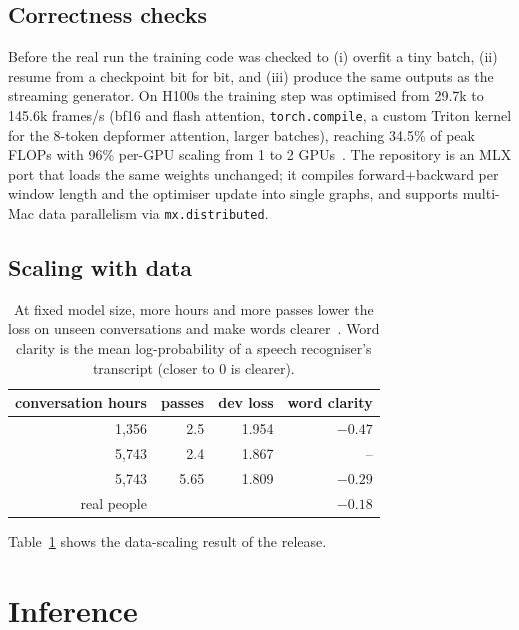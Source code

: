\documentclass[10pt]{article}
\begin{document}
\subsection{Correctness checks}
Before the real run the training code was checked to (i) overfit a tiny batch, (ii) resume from a checkpoint bit for bit, and (iii) produce the same outputs as the streaming generator. On H100s the training step was optimised from 29.7k to 145.6k frames/s (bf16 and flash attention, \texttt{torch.compile}, a custom Triton kernel for the 8-token depformer attention, larger batches), reaching 34.5\% of peak FLOPs with 96\% per-GPU scaling from 1 to 2 GPUs~\cite{caramel1}. The repository is an MLX port that loads the same weights unchanged; it compiles forward+backward per window length and the optimiser update into single graphs, and supports multi-Mac data parallelism via \texttt{mx.distributed}.

\subsection{Scaling with data}
\begin{table}[t]\centering\small
\begin{tabular}{rrrr}\toprule
conversation hours & passes & dev loss & word clarity\\\midrule
1{,}356 & 2.5 & 1.954 & $-0.47$\\
5{,}743 & 2.4 & 1.867 & --\\
5{,}743 & 5.65 & 1.809 & $-0.29$\\
real people & & & $-0.18$\\\bottomrule
\end{tabular}
\caption{At fixed model size, more hours and more passes lower the loss on unseen conversations and make words clearer~\cite{caramel1}. Word clarity is the mean log-probability of a speech recogniser's transcript (closer to 0 is clearer).}
\label{tab:scaling}
\end{table}
Table~\ref{tab:scaling} shows the data-scaling result of the release.

\section{Inference}
\label{sec:infer}
\end{document}
